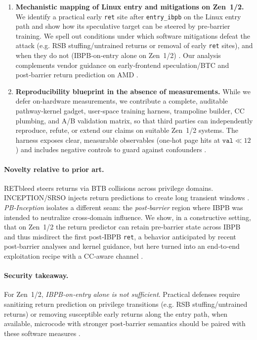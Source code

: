 \documentclass[11pt,a4paper]{article}
\begin{document}
\begin{enumerate}
  \item \textbf{Mechanistic mapping of Linux entry and mitigations on Zen~1/2.}
  We identify a practical early \texttt{ret} site after \texttt{entry\_ibpb} on the Linux entry path and show how its speculative target can be steered by pre‑barrier training. We spell out conditions under which software mitigations defeat the attack (e.g. RSB stuffing/untrained returns or removal of early \texttt{ret} sites), and when they do not (IBPB‑on‑entry alone on Zen~1/2) \cite{linux_srso_doc,linux_rsb_doc,wikner2025breaking}. Our analysis complements vendor guidance on early‑frontend speculation/BTC and post‑barrier return prediction on AMD  \cite{amd2022btc,amd_software_spec,intel_pbrsb,intel_rrsba}.

  \item \textbf{Reproducibility blueprint in the absence of measurements.}
  While we defer on‑hardware measurements, we contribute a complete, auditable pathway-kernel gadget, user‑space training harness, trampoline builder, CC plumbing, and A/B validation matrix, so that third parties can independently reproduce, refute, or extend our claims on suitable Zen~1/2 systems. The harness exposes clear, measurable observables (one‑hot page hits at \(\texttt{val} \ll 12\)) and includes negative controls to guard against confounders \cite{linux_srso_doc,linux_rsb_doc,wikner2025breaking}.
\end{enumerate}

\paragraph{Novelty relative to prior art.}
RETbleed steers returns via BTB collisions across privilege domains. INCEPTION/SRSO injects return predictions to create long transient windows \cite{wikner2022retbleed,trujillo2023inception}. \emph{PB‑Inception} isolates a different seam: the \emph{post‑barrier} region where IBPB was intended to neutralize cross‑domain influence. We show, in a constructive setting, that on Zen~1/2 the return predictor can retain pre‑barrier state across IBPB and thus misdirect the first post‑IBPB \texttt{ret}, a behavior anticipated by recent post‑barrier analyses and kernel guidance, but here turned into an end‑to‑end exploitation recipe with a CC‑aware channel \cite{wikner2025breaking,linux_srso_doc,linux_rsb_doc,intel_pbrsb,intel_rrsba}.

\paragraph{Security takeaway.}
For Zen~1/2, \emph{IBPB‑on‑entry alone is not sufficient}. Practical defenses require sanitizing return prediction on privilege transitions (e.g. RSB stuffing/untrained returns) or removing susceptible early returns along the entry path, when available, microcode with stronger post‑barrier semantics should be paired with these software measures \cite{linux_srso_doc,linux_rsb_doc,wikner2025breaking}.
\end{document}
